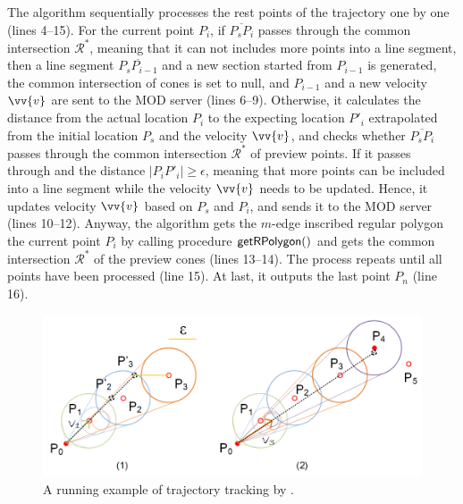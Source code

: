 The algorithm sequentially processes the rest points of the trajectory one by one (lines 4--15). 
For the current point $P_{i}$, if $\overline{P_sP_{i}}$ passes through the common intersection $\mathcal{R}^*$, meaning that it can not includes more points into a line segment, then a line segment $\overline{P_sP_{i-1}}$ and a new section started from  $P_{i-1}$ is generated, the common intersection of cones is set to null, and $P_{i-1}$ and a new velocity $\vv{v}$ are sent to the MOD server (lines 6--9).
%
Otherwise, it calculates the distance from the actual location $P_{i}$ to the expecting location $P'_{i}$ extrapolated from the initial location $P_s$ and the velocity $\vv{v}$, and checks whether $\overline{P_sP_{i}}$ passes through the common intersection $\mathcal{R}^*$ of preview points.
If it passes through and the distance $|P_{i}P'_{i}| \ge \epsilon$, meaning that more points can be included into a line segment while the velocity $\vv{v}$ needs to be updated. Hence, it updates velocity $\vv{v}$ based on $P_s$ and $P_{i}$, and sends it to the MOD server (lines 10--12). 
%
Anyway, the algorithm gets the $m$-edge inscribed regular polygon \wrt the current point $P_{i}$ by calling procedure ${\mathsf{getRPolygon()}}$ \cite{Lin:Cised} and gets the common intersection $\mathcal{R}^*$ of the preview cones (lines 13--14). The process repeats until all points have been processed (line 15).
At last, it outputs the last point $P_{n}$ (line 16).
%





\begin{figure}[tb!]
	\centering
	\includegraphics[scale=1.0]{figures/Fig-CITT.png}
	\vspace{-2ex}
	\caption{\small A running example of trajectory tracking by \citt. }
	\vspace{-3ex}
	\label{fig:citt}
\end{figure}


